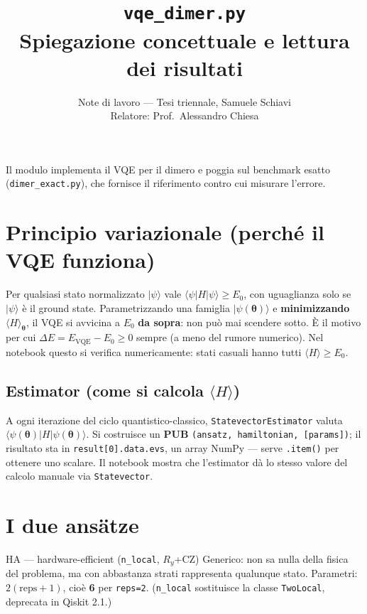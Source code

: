 \documentclass[11pt,a4paper]{article}
\title{\vspace{-1.5em}\color{inkblue}\texttt{vqe\_dimer.py}\\[0.2em]
\Large\normalfont\color{softgray}Spiegazione concettuale e lettura dei risultati}
\author{Note di lavoro --- Tesi triennale, Samuele Schiavi\\ Relatore: Prof.\ Alessandro Chiesa}
\date{}
\begin{document}
\sloppy
\maketitle
\thispagestyle{fancy}
\vspace{-2.6em}

Il modulo implementa il VQE per il dimero e poggia sul benchmark esatto
(\texttt{dimer\_exact.py}), che fornisce il riferimento contro cui
misurare l'errore.

\section*{Principio variazionale (perché il VQE funziona)}

Per qualsiasi stato normalizzato $|\psi\rangle$ vale
$\langle\psi|H|\psi\rangle \geq E_0$, con uguaglianza solo se
$|\psi\rangle$ è il ground state. Parametrizzando una famiglia
$|\psi(\boldsymbol\theta)\rangle$ e \textbf{minimizzando}
$\langle H\rangle_{\boldsymbol\theta}$, il VQE si avvicina a $E_0$
\textbf{da sopra}: non può mai scendere sotto. È il motivo per cui
$\Delta E = E_\text{VQE} - E_0 \geq 0$ sempre (a meno del rumore
numerico). Nel notebook questo si verifica numericamente: stati casuali
hanno tutti $\langle H\rangle \geq E_0$.

\subsection*{Estimator (come si calcola $\langle H\rangle$)}

A ogni iterazione del ciclo quantistico-classico,
\texttt{StatevectorEstimator} valuta
$\langle\psi(\boldsymbol\theta)|H|\psi(\boldsymbol\theta)\rangle$. Si
costruisce un \textbf{PUB} \texttt{(ansatz, hamiltonian, [params])}; il
risultato sta in \texttt{result[0].data.evs}, un array NumPy --- serve
\texttt{.item()} per ottenere uno scalare. Il notebook mostra che
l'estimator dà lo stesso valore del calcolo manuale via
\texttt{Statevector}.

\section*{I due ansätze}

\begin{panelbox}{HA --- hardware-efficient (\texttt{n\_local}, $R_y$+CZ)}
Generico: non sa nulla della fisica del problema, ma con abbastanza
strati rappresenta qualunque stato. Parametri: $2(\text{reps}+1)$, cioè
\textbf{6} per \texttt{reps=2}. (\texttt{n\_local} sostituisce la classe
\texttt{TwoLocal}, deprecata in Qiskit 2.1.)
\end{panelbox}
\smallskip
\end{document}
